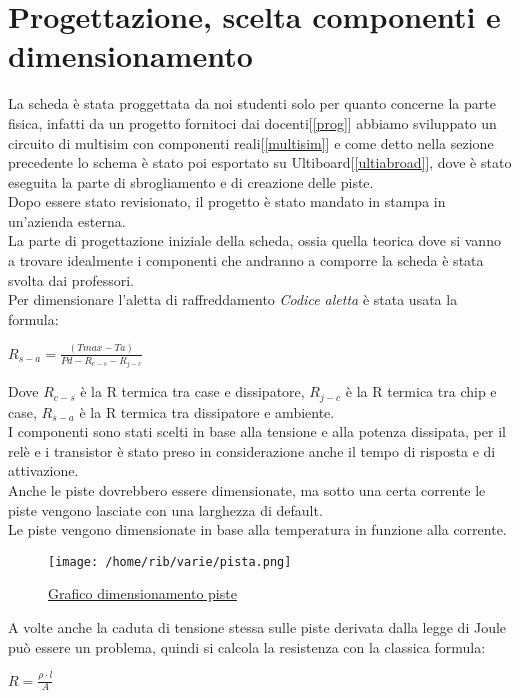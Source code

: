 \documentclass[12pt]{article}
\begin{document}
\section{Progettazione, scelta componenti e dimensionamento}
La scheda è stata proggettata da noi studenti solo per quanto concerne la parte fisica, infatti da un progetto fornitoci dai docenti[\ref{prog}] abbiamo sviluppato un circuito di multisim con 
componenti reali[\ref{multisim}] e come detto nella sezione precedente lo schema è stato poi esportato su Ultiboard[\ref{ultiabroad}], dove è stato eseguita la parte di sbrogliamento e di creazione delle piste.\\
Dopo essere stato revisionato, il progetto è stato mandato in stampa in un'azienda esterna.\\
\vskip 2mm
\noindent
La parte di progettazione iniziale della scheda, ossia quella teorica dove si vanno a trovare idealmente i componenti che andranno a comporre la scheda è stata svolta dai professori.\\
Per dimensionare l'aletta di raffreddamento \textit{Codice aletta} è stata usata la formula:

\begin{center}
$R_{s-a}=\frac{(Tmax-Ta)}{Pd-R_{c-s}-R_{j-c}}$\\
\end{center}
\noindent
Dove \textit{$R_{c-s}$} è la R termica tra case e dissipatore, \textit{$R_{j-c}$} è la R termica tra chip e case, \textit{$R_{s-a}$} è la R termica tra dissipatore e ambiente.\\
I componenti sono stati scelti in base alla tensione e alla potenza dissipata, per il relè e i transistor è stato preso in considerazione anche il tempo di risposta e di attivazione.\\
Anche le piste dovrebbero essere dimensionate, ma sotto una certa corrente le piste vengono lasciate con una larghezza di default.\\ 
Le piste vengono dimensionate in base alla temperatura in funzione alla corrente.\\

\begin{figure}[H]
  \centering
  \texttt{[image: /home/rib/varie/pista.png]}
  \caption{\href{https://www.vincenzov.net/tutorial/stampati/spessorepiste.htm}{Grafico dimensionamento piste}}
  \label{lepistelepistelepiste}
\end{figure}
\noindent
A volte anche la caduta di tensione stessa sulle piste derivata dalla legge di Joule può essere un problema, quindi si calcola la resistenza con la classica formula:
\begin{center}
    $\textit{R}=\frac{\rho\cdot\textit{l}}{\textit{A}}$
\end{center}
\end{document}
